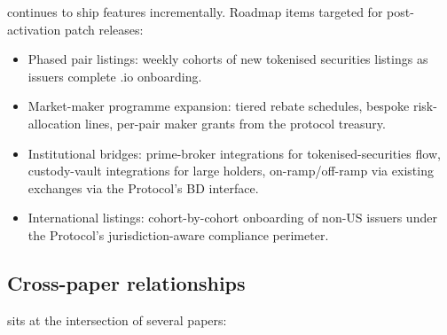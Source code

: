 \Zoo{} \DEX{} continues to ship features incrementally. Roadmap
items targeted for post-activation patch releases:

\begin{itemize}[leftmargin=1.2em]
  \item Phased pair listings: weekly cohorts of new tokenised
        securities listings as issuers complete \Liquidity{}.io
        onboarding.
  \item Market-maker programme expansion: tiered rebate schedules,
        bespoke risk-allocation lines, per-pair maker grants from
        the protocol treasury.
  \item Institutional bridges: prime-broker integrations for
        tokenised-securities flow, custody-vault integrations for
        large holders, on-ramp/off-ramp via existing exchanges via
        the \Liquidity{} Protocol's BD interface.
  \item International listings: cohort-by-cohort onboarding of
        non-US issuers under the \Liquidity{} Protocol's
        jurisdiction-aware compliance perimeter.
\end{itemize}

\subsection{Cross-paper relationships}

\Zoo{} \DEX{} sits at the intersection of several \Zoo{} papers:

